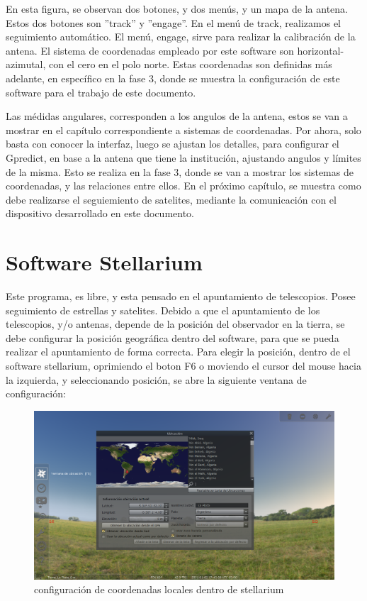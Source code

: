 En esta figura, se observan dos botones, y dos menús, y un mapa de la antena. Estos dos botones son ''track'' y ''engage''. En el menú de track, realizamos el seguimiento automático. El menú, engage, sirve para realizar la calibración de la antena. El sistema de coordenadas empleado por este software son horizontal-azimutal, con el cero en el polo norte. Estas coordenadas son definidas más adelante, en específico en la fase 3, donde se muestra la configuración de este software para el trabajo de este documento.  

Las médidas angulares, corresponden a los angulos de la antena, estos se van a mostrar en el capítulo correspondiente a sistemas de coordenadas. Por ahora, solo basta con conocer la interfaz, luego se ajustan los detalles, para configurar el Gpredict, en base a la antena que tiene la institución, ajustando angulos y límites de la misma. Esto se realiza en la fase 3, donde se van a mostrar los sistemas de coordenadas, y las relaciones entre ellos. En el próximo capítulo, se muestra como debe realizarse el seguiemiento de satelites, mediante la comunicación con el dispositivo desarrollado en este documento. 



 
\section{Software Stellarium} 


Este programa, es libre, y esta pensado en el apuntamiento de telescopios. Posee seguimiento de estrellas y satelites. Debido a que el apuntamiento de los telescopios, y/o antenas, depende de la posición del observador en la tierra, se debe configurar la posición geográfica dentro del software, para que se pueda realizar el apuntamiento de forma correcta. Para elegir la posición, dentro de el software stellarium, oprimiendo el boton F6 o moviendo el cursor del mouse hacia la izquierda, y seleccionando posición, se abre la siguiente ventana de configuración: 
\begin{figure}[ht]
	\includegraphics[width=\textwidth]{stel_sel_pos} 
	\caption{configuración de coordenadas locales dentro de stellarium} 
	\label{fig:stell_poss_conf}
\end{figure}

